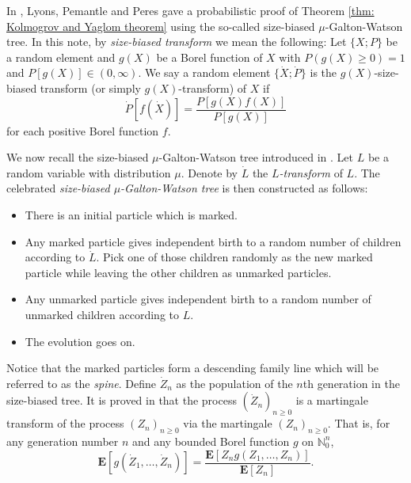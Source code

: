 \documentclass[12pt,a4paper]{amsart}
\numberwithin{equation}{section}
\begin{document}
	In \cite{lyons1995conceptual}, Lyons, Pemantle and Peres gave a probabilistic proof of Theorem \ref{thm: Kolmogrov and Yaglom theorem} using the so-called size-biased $\mu$-Galton-Watson tree.
	In this note, by \emph{size-biased transform} we mean the following: 
	Let $\{X;P\}$ be a random element and $g(X)$ be a Borel function of $X$ with $P(g(X) \geq 0) = 1$ and $P[g(X)]\in (0,\infty)$. 
	We say a random element $\{\dot X;\dot P\}$ is the $g(X)$-size-biased transform (or simply $g(X)$-transform) of $X$ if 
	\[
		\dot P[f(\dot X)] = \frac{ P[g(X)f(X)]}{P[g(X)]} 
	\]
	for each positive Borel function $f$.

	We now recall the size-biased $\mu$-Galton-Watson tree introduced in \cite{lyons1995conceptual}.
	Let $L$ be a random variable with distribution $\mu$.
	Denote by $\dot L$ the \emph{$L$-transform} of $L$.
	The celebrated \emph{size-biased $\mu$-Galton-Watson tree} is then constructed as follows:
\begin{itemize}
\item
	There is an initial particle which is marked.
\item
	Any marked particle gives independent birth to a random number of children according to $\dot L$. Pick one of those children randomly as the new marked particle while leaving the other children as unmarked particles.
\item
	Any unmarked particle gives independent birth to a random number of unmarked children according to $L$.
\item
	The evolution goes on.
\end{itemize}

	Notice that the marked particles form a descending family line which will be referred to as the \emph{spine}.
	Define $\dot Z_n$ as the population of the $n$th generation in the size-biased tree.
	It is proved in \cite{lyons1995conceptual} that the process $(\dot Z_n)_{n\ge 0}$ is a martingale transform of the process $(Z_n)_{n\ge 0}$ via the martingale $(Z_n)_{n\ge 0}.$
	That is, for any generation number $n$ and any bounded Borel function $g$ on $\mathbb N_0^{n}$,
\begin{equation}
\label{eq:htransformation}
	\mathbf E [ g ( \dot Z_1, \dots, \dot Z_n) ]
	= \frac { \mathbf E[ Z_n g( Z_1, \dots, Z_n)]} {\mathbf E [ Z_n]}.
\end{equation}
\end{document}
